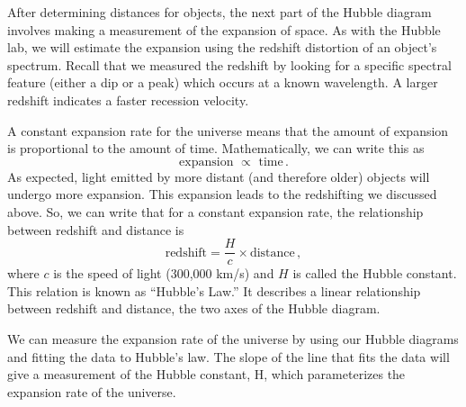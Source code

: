 After determining distances for objects, the next part of the Hubble
diagram involves making a measurement of the expansion of space. As
with the Hubble lab, we will estimate the expansion using the redshift
distortion of an object's spectrum. Recall that we measured the redshift
by looking for a specific spectral feature (either a dip or a peak) which
occurs at a known wavelength. A larger redshift indicates a faster recession velocity.

A constant expansion rate for the universe means that the amount of
expansion is proportional to the amount of time. Mathematically, we can
write this as
\begin{equation}
 \textrm{expansion } \propto \textrm{ time} \,.
\end{equation}
As expected, light emitted by more distant (and therefore older) objects
will undergo more expansion. This expansion leads to the redshifting
we discussed above. So, we can write that for a constant expansion rate,
the relationship between redshift and distance is
\begin{equation}\label{de:eq:hubble}
 \textrm{redshift} = \frac{H}{c} \times \textrm{distance} \,,
\end{equation}
where $c$ is the speed of light (300,000 km/s) and $H$ is called the Hubble
constant. This relation is known as “Hubble’s Law.” It describes a linear
relationship between redshift and distance, the two axes of the Hubble
diagram.

We can measure the expansion rate of the universe by using our Hubble
diagrams and fitting the data to Hubble’s law. The slope of the line that
fits the data will give a measurement of the Hubble constant, H, which
parameterizes the expansion rate of the universe.

